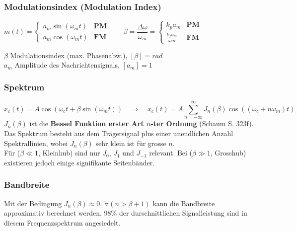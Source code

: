 \subsubsection{Modulationsindex (Modulation Index)}
\begin{minipage}[t][0.7cm][c]{10cm}

$ m(t) = \begin{cases}
          	a_m \sin(\omega_m t)  & \textbf{PM}\\
          	a_m \cos(\omega_m t)  & \textbf{FM}
          \end{cases}  
\qquad
\beta = \dfrac{\Delta \omega}{\omega_m} =
\begin{cases}
	k_p a_m & \textbf{PM}  \\
	\frac{k_f a_m}{\omega m} & \textbf{FM}
\end{cases} 
$
\end{minipage}
\begin{minipage}[t][0.7cm][c]{8cm}
	$\beta$ Modulationsindex (max. Phasenabw.), $[\beta] = rad$ \\
	$a_m$ Amplitude des Nachrichtensignals, $[a_m] = 1$ %
\end{minipage}

\subsubsection{Spektrum}
$$x_c(t) = A \cos(\omega_c t + \beta \sin(\omega_m t)) \quad \Rightarrow \quad 
x_c(t) = A \sum\limits_{n=-\infty}^{\infty} J_n(\beta) \cos((\omega_c + n \omega_m)t)$$
\textbf{$J_n(\beta)$} ist die \textbf{Bessel Funktion erster Art $n$-ter Ordnung} (Schaum
S. 323f). Das Spektrum besteht aus dem Trägersignal plus einer unendlichen Anzahl Spektrallinien,
wobei $J_n(\beta)$ sehr klein ist für grosse $n$. \\
Für ($\beta \ll 1$, Kleinhub) sind nur $J_0$, $J_1$ und $ J_{-1}$ relevant. Bei ($\beta \gg 1$,
Grosshub) existieren jedoch einige signifikante Seitenbänder.

\subsubsection{Bandbreite}
Mit der Bedingung $J_n(\beta) \approx 0, \,\forall (n > \beta + 1)$ kann die Bandbreite approximativ
berechnet werden. 98\% der durschnittlichen Signalleistung sind in diesem
Frequenzspektrum angesiedelt. 

